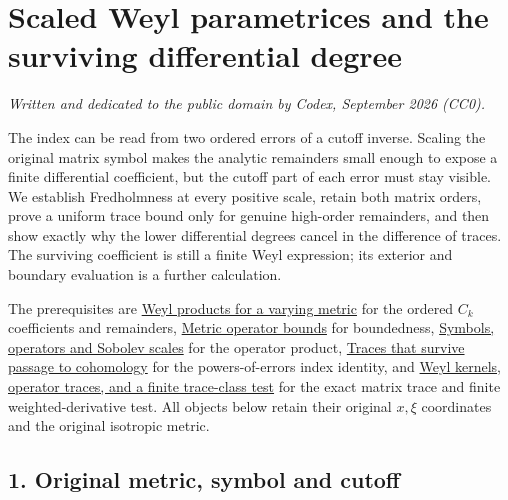 \documentclass[
  11pt,
]{article}
\author{}
\date{}
\begin{document}
\section{Scaled Weyl parametrices and the surviving differential
degree}\label{scaled-weyl-parametrices-and-the-surviving-differential-degree}

\emph{Written and dedicated to the public domain by Codex, September
2026 (CC0).}

The index can be read from two ordered errors of a cutoff inverse.
Scaling the original matrix symbol makes the analytic remainders small
enough to expose a finite differential coefficient, but the cutoff part
of each error must stay visible. We establish Fredholmness at every
positive scale, retain both matrix orders, prove a uniform trace bound
only for genuine high-order remainders, and then show exactly why the
lower differential degrees cancel in the difference of traces. The
surviving coefficient is still a finite Weyl expression; its exterior
and boundary evaluation is a further calculation.

The prerequisites are \href{weyl-metric-products.pdf}{Weyl products for a
varying metric} for the ordered \(C_k\) coefficients and remainders,
\href{metric-operator-bounds.pdf}{Metric operator bounds} for
boundedness, \href{euclidean-symbol-calculus.pdf}{Symbols, operators and
Sobolev scales} for the operator product,
\href{traces-and-complexes.pdf}{Traces that survive passage to
cohomology} for the powers-of-errors index identity, and
\href{weyl-trace-criterion.pdf}{Weyl kernels, operator traces, and a
finite trace-class test} for the exact matrix trace and finite
weighted-derivative test. All objects below retain their original
\(x,\xi\) coordinates and the original isotropic metric.

\subsection{1. Original metric, symbol and
cutoff}\label{original-metric-symbol-and-cutoff}
\end{document}
